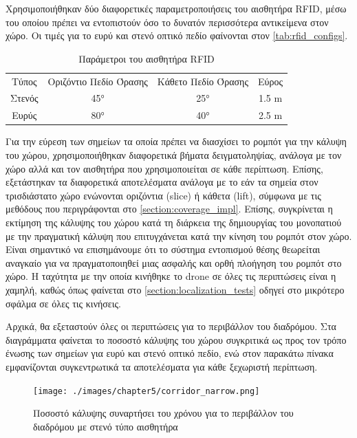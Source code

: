 Χρησιμοποιήθηκαν δύο διαφορετικές παραμετροποιήσεις του αισθητήρα RFID, μέσω του οποίου πρέπει να εντοπιστούν όσο το δυνατόν περισσότερα αντικείμενα στον χώρο. Οι τιμές για το ευρύ και στενό οπτικό πεδίο φαίνονται στον \autoref{tab:rfid_configs}.

\begin{table}[H]
    \begin{center}
        \caption{Παράμετροι του αισθητήρα RFID}
        \label{tab:rfid_configs}
        \begin{tabular}{ | c | c | c | c |}
        \hline
        \rowcolor{Gray}
        Τύπος & Οριζόντιο Πεδίο Όρασης & Κάθετο Πεδίο Όρασης & Εύρος\\
        Στενός & \ang{45} & \ang{25} & 1.5 \si{m} \\
        Ευρύς & \ang{80} & \ang{40} & 2.5 \si{m} \\
        \hline
        \end{tabular}
    \end{center}
\end{table}

Για την εύρεση των σημείων τα οποία πρέπει να διασχίσει το ρομπότ για την κάλυψη του χώρου, χρησιμοποιήθηκαν διαφορετικά βήματα δειγματοληψίας, ανάλογα με τον χώρο αλλά και τον αισθητήρα που χρησιμοποιείται σε κάθε περίπτωση. Επίσης, εξετάστηκαν τα διαφορετικά αποτελέσματα ανάλογα με το εάν τα σημεία στον τρισδιάστατο χώρο ενώνονται οριζόντια (slice) ή κάθετα (lift), σύμφωνα με τις μεθόδους που περιγράφονται στο \autoref{section:coverage_impl}. Επίσης, συγκρίνεται η εκτίμηση της κάλυψης του χώρου κατά τη διάρκεια της δημιουργίας του μονοπατιού με την πραγματική κάλυψη που επιτυγχάνεται κατά την κίνηση του ρομπότ στον χώρο. Είναι σημαντικό να επισημάνουμε ότι το σύστημα εντοπισμού θέσης θεωρείται αναγκαίο για να πραγματοποιηθεί μιας ασφαλής και ορθή πλοήγηση του ρομπότ στο χώρο. Η ταχύτητα με την οποία κινήθηκε το drone σε όλες τις περιπτώσεις είναι η χαμηλή, καθώς όπως φαίνεται στο \autoref{section:localization_tests} οδηγεί στο μικρότερο σφάλμα σε όλες τις κινήσεις.

Αρχικά, θα εξεταστούν όλες οι περιπτώσεις για το περιβάλλον του διαδρόμου. Στα διαγράμματα φαίνεται το ποσοστό κάλυψης του χώρου συγκριτικά ως προς τον τρόπο ένωσης των σημείων για ευρύ και στενό οπτικό πεδίο, ενώ στον παρακάτω πίνακα εμφανίζονται συγκεντρωτικά τα αποτελέσματα για κάθε ξεχωριστή περίπτωση.

\begin{figure}[!ht]
    \texttt{[image: ./images/chapter5/corridor\_narrow.png]}
    \caption{Ποσοστό κάλυψης συναρτήσει του χρόνου για το περιβάλλον του διαδρόμου με στενό τύπο αισθητήρα}
     \label{fig:corridor_narrow}
\end{figure} 

